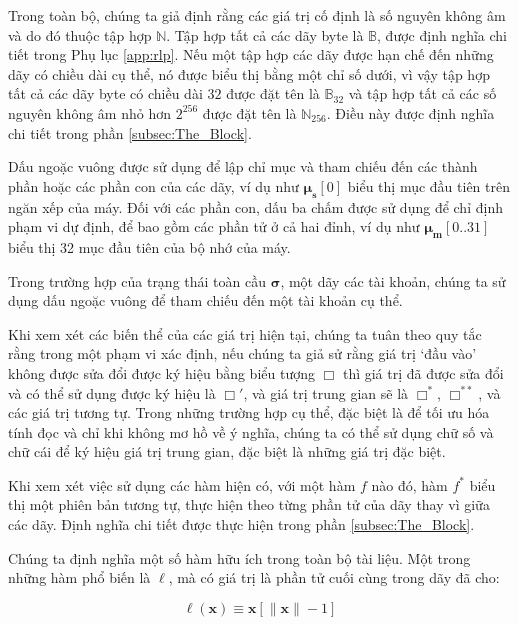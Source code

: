 \documentclass[9pt,oneside]{amsart}
\makeatletter
\newcommand{\linkdest}[1]{\Hy@raisedlink{\hypertarget{#1}{}}}
\makeatother
\begin{document}
\begin{multicols}{2}
Trong toàn bộ, chúng ta giả định rằng các giá trị cố định là số nguyên không âm và do đó thuộc tập hợp $\mathbb{N}$. Tập hợp tất cả các dãy byte là $\mathbb{B}$, được định nghĩa chi tiết trong Phụ lục \ref{app:rlp}. Nếu một tập hợp các dãy được hạn chế đến những dãy có chiều dài cụ thể, nó được biểu thị bằng một chỉ số dưới, vì vậy tập hợp tất cả các dãy byte có chiều dài $32$ được đặt tên là $\mathbb{B}_{32}$ và tập hợp tất cả các số nguyên không âm nhỏ hơn $2^{256}$ được đặt tên là $\mathbb{N}_{256}$. Điều này được định nghĩa chi tiết trong phần \hyperlink{block}{\ref{subsec:The_Block}}.

Dấu ngoặc vuông được sử dụng để lập chỉ mục và tham chiếu đến các thành phần hoặc các phần con của các dãy, ví dụ như $\boldsymbol{\mu}_{\mathbf{s}}[0]$ biểu thị mục đầu tiên trên ngăn xếp của máy. Đối với các phần con, dấu ba chấm được sử dụng để chỉ định phạm vi dự định, để bao gồm các phần tử ở cả hai đỉnh, ví dụ như $\boldsymbol{\mu}_{\mathbf{m}}[0..31]$ biểu thị 32 mục đầu tiên của bộ nhớ của máy.

Trong trường hợp của trạng thái toàn cầu $\boldsymbol{\sigma}$, một dãy các tài khoản, chúng ta sử dụng dấu ngoặc vuông để tham chiếu đến một tài khoản cụ thể.

Khi xem xét các biến thể của các giá trị hiện tại, chúng ta tuân theo quy tắc rằng trong một phạm vi xác định, nếu chúng ta giả sử rằng giá trị `đầu vào' không được sửa đổi được ký hiệu bằng biểu tượng $\Box$ thì giá trị đã được sửa đổi và có thể sử dụng được ký hiệu là $\Box'$, và giá trị trung gian sẽ là $\Box^*$, $\Box^{**}$, và các giá trị tương tự. Trong những trường hợp cụ thể, đặc biệt là để tối ưu hóa tính đọc và chỉ khi không mơ hồ về ý nghĩa, chúng ta có thể sử dụng chữ số và chữ cái để ký hiệu giá trị trung gian, đặc biệt là những giá trị đặc biệt.

Khi xem xét việc sử dụng các hàm hiện có, với một hàm $f$ nào đó, hàm \hyperlink{general_element_wise_sequence_transformation_f_pow_asterisk}{$f^*$} biểu thị một phiên bản tương tự, thực hiện theo từng phần tử của dãy thay vì giữa các dãy. Định nghĩa chi tiết được thực hiện trong phần \hyperlink{block}{\ref{subsec:The_Block}}.

Chúng ta định nghĩa một số hàm hữu ích trong toàn bộ tài liệu. \linkdest{ell}Một trong những hàm phổ biến là $\ell$, mà có giá trị là phần tử cuối cùng trong dãy đã cho:

\begin{equation}
\ell(\mathbf{x}) \equiv \mathbf{x}[\lVert \mathbf{x} \rVert - 1]
\end{equation}


\end{multicols}
\end{document}
